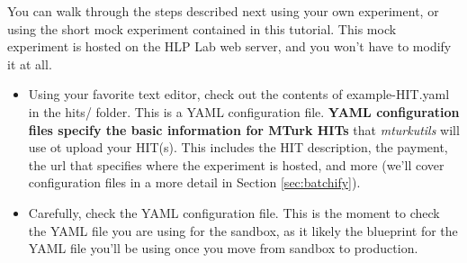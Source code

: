 \documentclass{article}
\begin{document}
You can walk through the steps described next using your own experiment, or using the short mock experiment contained in this tutorial. This mock experiment is hosted on the HLP Lab web server, and you won't have to modify it at all.

\begin{itemize}

   \item Using your favorite text editor, check out the contents of example-HIT.yaml in the hits/ folder. This is a YAML configuration file. {\bf YAML configuration files specify the basic information for MTurk HITs} that {\em mturkutils} will use ot upload your HIT(s). This includes the HIT description, the payment, the url that specifies where the experiment is hosted, and more (we'll cover configuration files in a more detail in Section \ref{sec:batchify}). 
   
   \item Carefully, check the YAML configuration file. This is the moment to check the YAML file you are using for the sandbox, as it likely the blueprint for the YAML file you'll be using once you move from sandbox to production.
   

\end{itemize}
\end{document}
